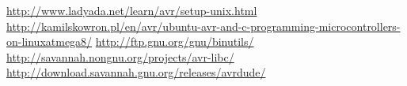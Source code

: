 \begin{thebibliography}{99}
 \url{http://www.ladyada.net/learn/avr/setup-unix.html}
 \url{http://kamilskowron.pl/en/avr/ubuntu-avr-and-c-programming-microcontrollers-on-linuxatmega8/}
\url{http://ftp.gnu.org/gnu/binutils/}
\url{http://savannah.nongnu.org/projects/avr-libc/}
\url{http://download.savannah.gnu.org/releases/avrdude/}
\end{thebibliography}